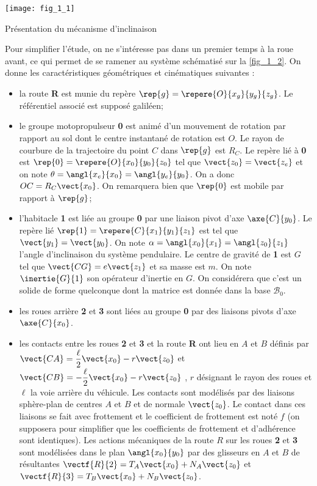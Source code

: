 \begin{marginfigure}%
\texttt{[image: fig\_1\_1]}

\caption{Présentation du mécanisme d'inclinaison}
\label{fig_1_1}
\end{marginfigure}


Pour simplifier l'étude, on ne s'intéresse pas dans un premier temps à la roue avant, ce qui permet de se ramener au système schématisé sur la \autoref{fig_1_2}. On donne les caractéristiques géométriques et cinématiques suivantes :
\begin{itemize}
\item la route \textbf{R} est munie du repère $\rep{g}=\repere{O}{x_g}{y_g}{z_g}$. Le référentiel associé est supposé galiléen;
\item le groupe motopropulseur \textbf{0} est animé d'un mouvement de rotation par rapport au sol dont le centre instantané de rotation est $O$. Le rayon de courbure de la trajectoire du point $C$ dans $\rep{g}$ est $R_C$. Le repère lié à \textbf{0} est $\rep{0}=\repere{O}{x_0}{y_0}{z_0}$ tel que $\vect{z_0}=\vect{z_e}$ et on note $\theta=\angl{x_e}{x_0}=\angl{y_e}{y_0}$. On a donc $OC=R_C\vect{x_0}$. On remarquera bien que $\rep{0}$ est mobile par rapport à $\rep{g}$;
\item l'habitacle \textbf{1} est liée au groupe \textbf{0} par une liaison pivot d'axe $\axe{C}{y_0}$. Le repère lié $\rep{1}=\repere{C}{x_1}{y_1}{z_1}$ est tel que $\vect{y_1}=\vect{y_0}$. On note $\alpha=\angl{x_0}{x_1}=\angl{z_0}{z_1}$ l'angle d'inclinaison du système pendulaire. Le centre de gravité de \textbf{1} est $G$ tel que $\vect{CG}=e\vect{z_1}$ et sa masse est $m$. On note $\inertie{G}{1}$ son opérateur d'inertie en $G$. On considérera que c'est un solide de forme quelconque dont la matrice est donnée dans la base $\mathcal{B}_0$.
\item les roues arrière \textbf{2} et \textbf{3} sont liées au groupe \textbf{0} par des liaisons pivots d'axe $\axe{C}{x_0}$.
\item les contacts entre les roues \textbf{2} et \textbf{3} et la route \textbf{R} ont lieu en $A$ et $B$ définis par 
$\vect{CA}=\dfrac{\ell}{2}\vect{x_0}-r\vect{z_0}$ et $\vect{CB}=-\dfrac{\ell}{2}\vect{x_0}-r\vect{z_0}$ , $r$ désignant 
le rayon des roues et $\ell$ la voie arrière du véhicule. Les contacts sont modélisés par des liaisons sphère-plan de centres
 $A$ et $B$ et de normale $\vect{z_0}$. Le contact dans ces liaisons se fait avec frottement et le coefficient de frottement est
  noté $f$ (on supposera pour simplifier que les coefficients de frottement et d'adhérence sont identiques). Les actions
  mécaniques de la route $R$ sur les roues \textbf{2} et \textbf{3} sont modélisées dans le plan $\angl{x_0}{y_0}$  par des 
  glisseurs en $A$ et $B$ de résultantes 
  $\vectf{R}{2}=T_A\vect{x_0}+N_A\vect{z_0}$  et  $\vectf{R}{3}=T_B\vect{x_0}+N_B\vect{z_0}$.
\end{itemize}

